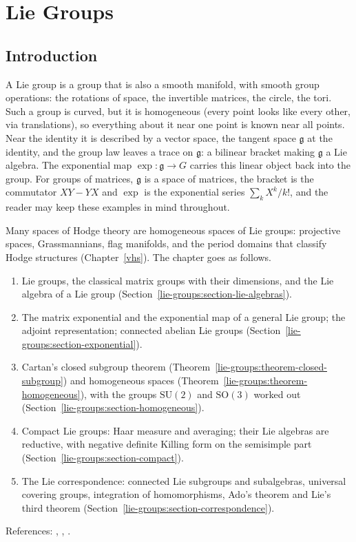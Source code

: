 \chapter{Lie Groups}\label{lie-groups}

\section{Introduction}\label{lie-groups:section-introduction}

A Lie group is a group that is also a smooth manifold, with smooth group operations: the rotations of space, the invertible matrices, the circle, the tori.
Such a group is curved, but it is homogeneous (every point looks like every other, via translations), so everything about it near one point is known near all
points. Near the identity it is described by a vector space, the tangent space $\mathfrak{g}$ at the identity, and the group law leaves a trace on
$\mathfrak{g}$: a bilinear bracket making $\mathfrak{g}$ a Lie algebra. The exponential map $\exp \colon \mathfrak{g} \to G$ carries this linear object back
into the group. For groups of matrices, $\mathfrak{g}$ is a space of matrices, the bracket is the commutator $XY - YX$ and $\exp$ is the exponential series
$\sum_kX^k/k!$, and the reader may keep these examples in mind throughout.

Many spaces of Hodge theory are homogeneous spaces of Lie groups: projective spaces, Grassmannians, flag manifolds, and the period domains that classify
Hodge structures (Chapter~\ref{vhs}). The chapter goes as follows.
\begin{enumerate}
\item Lie groups, the classical matrix groups with their dimensions, and the Lie algebra of a Lie group
(Section~\ref{lie-groups:section-lie-algebras}).
\item The matrix exponential and the exponential map of a general Lie group; the adjoint representation; connected abelian Lie groups
(Section~\ref{lie-groups:section-exponential}).
\item Cartan's closed subgroup theorem (Theorem~\ref{lie-groups:theorem-closed-subgroup}) and homogeneous spaces
(Theorem~\ref{lie-groups:theorem-homogeneous}), with the groups $\mathrm{SU}(2)$ and $\mathrm{SO}(3)$ worked out
(Section~\ref{lie-groups:section-homogeneous}).
\item Compact Lie groups: Haar measure and averaging; their Lie algebras are reductive, with negative definite Killing form on the semisimple part
(Section~\ref{lie-groups:section-compact}).
\item The Lie correspondence: connected Lie subgroups and subalgebras, universal covering groups, integration of homomorphisms, Ado's theorem and Lie's third theorem
(Section~\ref{lie-groups:section-correspondence}).
\end{enumerate}
References: \cite{knapp-lie}, \cite{brocker-tomdieck}, \cite{warner-foundations}.

